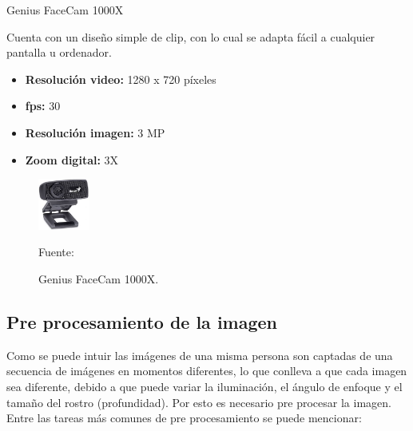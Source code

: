 \begin{enumerate}
{\bf\item[3. ] Genius FaceCam 1000X} \vskip 0.1cm
Cuenta con un diseño simple de clip, con lo cual se adapta fácil a cualquier pantalla u ordenador.
\begin{itemize}
\item[•] {\bf Resolución video:}
1280 x 720 píxeles
\item[•] {\bf fps:}
30
\item[•] {\bf Resolución imagen:}
3 MP
\item[•] {\bf Zoom digital:}
3X
\end{itemize}

\begin{figure}[ht]
\begin{center}
\includegraphics[width=0.15\textwidth]{Imagen11}
\end{center}
\begin{center}
\vskip -0.5cm
\caption{\small{Genius FaceCam 1000X.}}
{\small{Fuente: \cite{Amazon}}}
\end{center}
\end{figure}

\end{enumerate}
\vskip 1cm

\subsection{Pre procesamiento de la imagen}
Como se puede intuir las imágenes de una misma persona son captadas de una secuencia de imágenes en momentos diferentes, lo que conlleva a que cada imagen sea diferente, debido a que puede variar la iluminación, el ángulo de enfoque y el tamaño del rostro (profundidad). Por esto es necesario pre procesar la imagen. Entre las tareas más comunes de pre procesamiento se puede mencionar:

